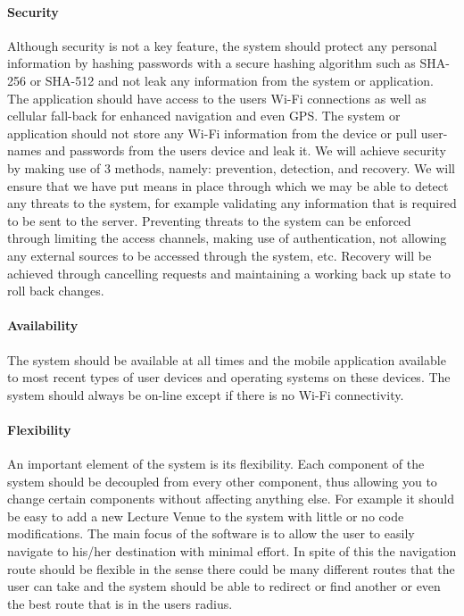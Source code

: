\documentclass[runningheads,a4paper]{llncs}
\begin{document}
\paragraph{\textbf{Security} \\}
Although security is not a key feature, the system should protect any personal information by hashing passwords with a secure hashing algorithm such as SHA-256 or SHA-512 and not leak any information from the system or application. The application should have access to the users Wi-Fi connections as well as cellular fall-back for enhanced navigation and even GPS. The system or application should not store any Wi-Fi information from the device or pull user-names and passwords from the users device and leak it.
We will achieve security by making use of 3 methods, namely: prevention, detection, and recovery. We will ensure that we have put means in
place through which we may be able to detect any threats to the system,
for example validating any information that is required to be sent to the
server. Preventing threats to the system can be enforced through limiting the access channels, making use of authentication, not allowing any
external sources to be accessed through the system, etc. Recovery will be
achieved through cancelling requests and maintaining a working back up
state to roll back changes.  

\paragraph{\textbf{Availability} \\}
 The system should be available at all times and the mobile application available to most recent types of user devices and operating systems on these devices. The system should always be on-line except if there is no Wi-Fi connectivity.

\paragraph{\textbf{Flexibility} \\}
 An important element of the system is its flexibility. 
 Each component of the system should be decoupled from every other component, thus allowing you to change certain components without affecting anything else. 
 For example it should be easy to add a new Lecture Venue to the system with little or no code modifications. 
 The main focus of the software is to allow the user to easily navigate to his/her destination with minimal effort.
 In spite of this the navigation route should be flexible in the sense there could be many different routes that the user can take and the system should be able to redirect or find another or even the best route that is in the users radius.
\end{document}
